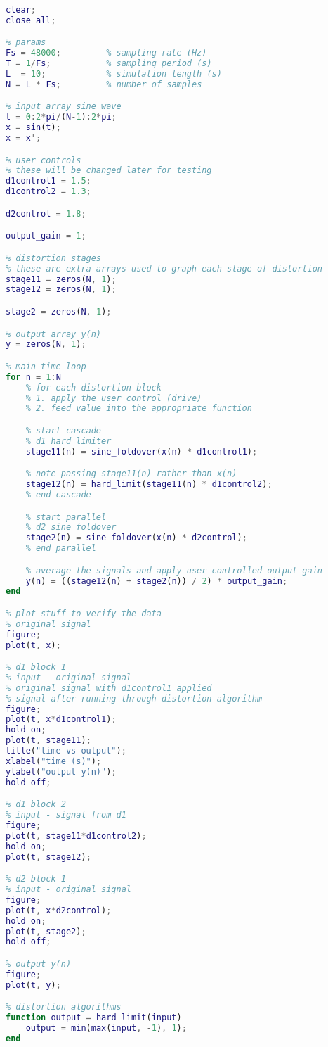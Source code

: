 \documentclass{article}
\begin{document}
\begin{appendix}
\begin{lstlisting}[language=MATLAB]
clear;
close all;

% params
Fs = 48000;         % sampling rate (Hz)
T = 1/Fs;           % sampling period (s)
L  = 10;            % simulation length (s)
N = L * Fs;         % number of samples

% input array sine wave
t = 0:2*pi/(N-1):2*pi;
x = sin(t);
x = x';

% user controls
% these will be changed later for testing
d1control1 = 1.5;
d1control2 = 1.3;

d2control = 1.8;

output_gain = 1;

% distortion stages
% these are extra arrays used to graph each stage of distortion
stage11 = zeros(N, 1);
stage12 = zeros(N, 1);

stage2 = zeros(N, 1);

% output array y(n)
y = zeros(N, 1);

% main time loop
for n = 1:N
    % for each distortion block
    % 1. apply the user control (drive)
    % 2. feed value into the appropriate function

    % start cascade
    % d1 hard limiter
    stage11(n) = sine_foldover(x(n) * d1control1);

    % note passing stage11(n) rather than x(n)
    stage12(n) = hard_limit(stage11(n) * d1control2);
    % end cascade

    % start parallel
    % d2 sine foldover
    stage2(n) = sine_foldover(x(n) * d2control);
    % end parallel

    % average the signals and apply user controlled output gain
    y(n) = ((stage12(n) + stage2(n)) / 2) * output_gain;
end

% plot stuff to verify the data
% original signal
figure;
plot(t, x);

% d1 block 1
% input - original signal
% original signal with d1control1 applied
% signal after running through distortion algorithm
figure;
plot(t, x*d1control1);
hold on;
plot(t, stage11);
title("time vs output");
xlabel("time (s)");
ylabel("output y(n)");
hold off;

% d1 block 2
% input - signal from d1
figure;
plot(t, stage11*d1control2);
hold on;
plot(t, stage12);

% d2 block 1
% input - original signal
figure;
plot(t, x*d2control);
hold on;
plot(t, stage2);
hold off;

% output y(n)
figure;
plot(t, y);

% distortion algorithms
function output = hard_limit(input)
    output = min(max(input, -1), 1);
end


\end{lstlisting}
\end{appendix}
\end{document}
